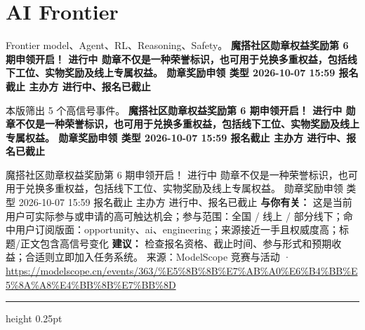 \documentclass[10.5pt]{ctexart}
\begin{document}
\section*{AI Frontier}
{\color{ormuted} Frontier model、Agent、RL、Reasoning、Safety。}
\vspace{2mm}
{\LARGE\bfseries 魔搭社区勋章权益奖励第 6 期申领开启！ 进行中 勋章不仅是一种荣誉标识，也可用于兑换多重权益，包括线下工位、实物奖励及线上专属权益。 勋章奖励申领 类型 2026-10-07 15:59 报名截止 主办方 进行中、报名已截止}\par
\vspace{1mm}
{\color{ormuted} 本版筛出 5 个高信号事件。}
\vspace{3mm}
{\Large\bfseries 魔搭社区勋章权益奖励第 6 期申领开启！ 进行中 勋章不仅是一种荣誉标识，也可用于兑换多重权益，包括线下工位、实物奖励及线上专属权益。 勋章奖励申领 类型 2026-10-07 15:59 报名截止 主办方 进行中、报名已截止}\par
魔搭社区勋章权益奖励第 6 期申领开启！ 进行中 勋章不仅是一种荣誉标识，也可用于兑换多重权益，包括线下工位、实物奖励及线上专属权益。 勋章奖励申领 类型 2026-10-07 15:59 报名截止 主办方 进行中、报名已截止
\textbf{与你有关：} 这是当前用户可实际参与或申请的高可触达机会；参与范围：全国 / 线上 / 部分线下；命中用户订阅版面：opportunity、ai、engineering；来源接近一手且权威度高；标题/正文包含高信号变化
\textbf{建议：} 检查报名资格、截止时间、参与形式和预期收益；合适则立即加入任务系统。
{\footnotesize\color{ormuted} 来源：ModelScope 竞赛与活动 · \url{https://modelscope.cn/events/363/%E5%8B%8B%E7%AB%A0%E6%B4%BB%E5%8A%A8%E4%BB%8B%E7%BB%8D}}
\vspace{4mm}
\hrule height 0.25pt
\vspace{3mm}
\end{document}
